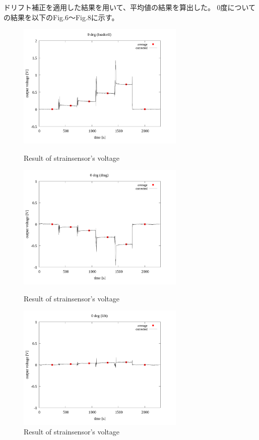 \documentclass[twocolumn,a4j]{jsarticle}
\begin{document}
ドリフト補正を適用した結果を用いて、平均値の結果を算出した。
0度についての結果を以下のFig.6～Fig.8に示す。

\begin{figure}[htbp]
    \footnotesize
    \begin{center}
        \includegraphics[width=80mm]{../images/0_loadcell_average.png}
        \caption{Result of strainsensor's voltage}
        \includegraphics[width=80mm]{../images/0_drag_average.png}
        \caption{Result of strainsensor's voltage}
        \includegraphics[width=80mm]{../images/0_lift_average.png}
        \caption{Result of strainsensor's voltage}
    \end{center}
\end{figure}
\newpage
\end{document}
